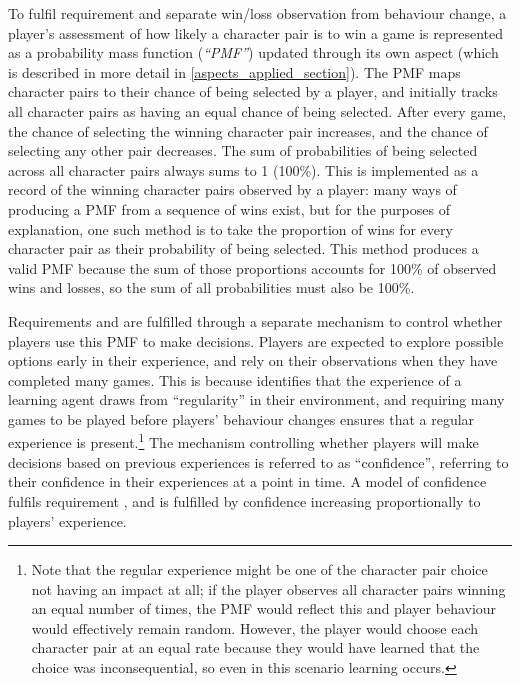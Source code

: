 To fulfil requirement  and separate win/loss observation from
behaviour change, a player's assessment of how likely a character pair is to win
a game is represented as a probability mass function (\emph{``PMF''}) updated
through its own aspect (which is described in more detail in
\cref{aspects_applied_section}). The PMF maps character pairs to their chance of
being selected by a player, and initially tracks all character pairs as having
an equal chance of being selected. After every game, the chance of selecting the
winning character pair increases, and the chance of selecting any other pair
decreases. The sum of probabilities of being selected across all character pairs
always sums to 1 (100\%). This is implemented as a record of the winning
character pairs observed by a player: many ways of producing a PMF from a
sequence of wins exist, but for the purposes of explanation, one such method is
to take the proportion of wins for every character pair as their probability of
being selected. This method produces a valid PMF because the sum of those
proportions accounts for 100\% of observed wins and losses, so the sum of all
probabilities must also be 100\%.

Requirements  and  are fulfilled through a separate
mechanism to control whether players use this PMF to make decisions. Players are
expected to explore possible options early in their experience, and rely on
their observations when they have completed many games. This is because
\citet{lachman1997learning} identifies that the experience of a learning agent
draws from ``regularity'' in their environment, and requiring many games to be
played before players' behaviour changes ensures that a regular experience is
present.\footnote{Note that the regular experience might be one of the character
pair choice not having an impact at all; if the player observes all character
pairs winning an equal number of times, the PMF would reflect this and player
behaviour would effectively remain random. However, the player would choose each
character pair at an equal rate because they would have learned that the choice
was inconsequential, so even in this scenario learning occurs.} The mechanism
controlling whether players will make decisions based on previous experiences is
referred to as ``confidence'', referring to their confidence in their experiences at a
point in time. A model of confidence fulfils requirement , and
 is fulfilled by confidence increasing proportionally to players'
experience.


